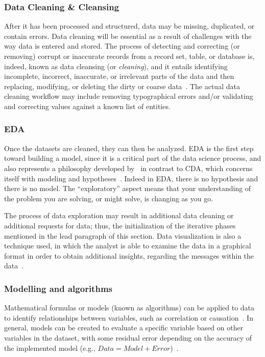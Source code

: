 \subsubsection{Data Cleaning \& Cleansing}
After it has been processed and structured, data may be missing, duplicated, or contain errors. Data cleaning will be essential as a result of challenges with the way data is entered and stored.
The process of detecting and correcting (or removing) corrupt or inaccurate records from a record set, table, or database is, indeed, known as data cleansing (or \textit{cleaning}), 
and it entails identifying incomplete, incorrect, inaccurate, or irrelevant parts of the data and then replacing, modifying, or deleting the dirty or coarse data~\cite{Misc:2019_data_cleaning_wiki}.
The actual data cleaning workflow may include removing typographical errors and/or validating and correcting values against a known list of entities.

\subsubsection{\acl{EDA}}
Once the datasets are cleaned, they can then be analyzed.
\ac{EDA} is the first step toward building a model, since it is a critical part of the data science process, and also represents a philosophy developed by~\citeauthor{Article:future_of_data_tukey} 
in contrast to \ac{CDA}, which concerns itself with modeling and hypotheses~\cite{Article:future_of_data_tukey}. 
Indeed in \ac{EDA}, there is no hypothesis and there is no model. The ``exploratory'' aspect means that your understanding of the problem you are solving, or might solve, is changing as you go.

The process of data exploration may result in additional data cleaning or additional requests for data; thus, the initialization of the iterative phases mentioned in the lead paragraph of this section.
Data visualization is also a technique used, in which the analyst is able to examine the data in a graphical format in order to obtain additional insights, regarding the messages within the data~\cite{Book:doing_data_science}.

\subsubsection{Modelling and algorithms}
Mathematical formulas or models (known as algorithms) can be applied to data to identify relationships between variables, such as correlation or causation~\cite{Book:pruneau_2017}.
In general, models can be created to evaluate a specific variable based on other variables in the dataset, with some residual error depending on the accuracy of the implemented model (e.g., $Data = Model + Error$)~\cite{Book:judd_1989_data_model}.

